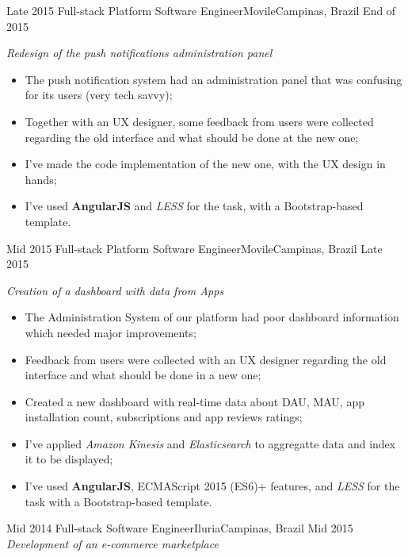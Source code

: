 \begin{experiences}
{\begin{itemize}
          \end{itemize}
        }{}
  \experience
  {Late 2015} {Full-stack Platform Software Engineer}{Movile}{Campinas, Brazil}
  {End of 2015}
        {
        \emph{Redesign of the push notifications administration panel}\\
          \begin{itemize}
            \item The push notification system had an administration panel that was confusing for its users (very tech savvy);
            \item Together with an UX designer, some feedback from users were collected regarding the old interface and what should
            be done at the new one;
            \item I've made the code implementation of the new one, with the UX design in hands;
            \item I've used \textbf{AngularJS} and \emph{LESS} for the task, with a Bootstrap-based template.\\
          \end{itemize}
        }{}
  \experience
  {Mid 2015} {Full-stack Platform Software Engineer}{Movile}{Campinas, Brazil}
  {Late 2015}
        {
        \emph{Creation of a dashboard with data from Apps}\\
          \begin{itemize}
            \item The Administration System of our platform had poor dashboard information which needed major improvements;
            \item Feedback from users were collected with an UX designer regarding the old interface and what should be done in a new one;
            \item Created a new dashboard with real-time data about DAU, MAU, app installation count, subscriptions and app reviews ratings;
            \item I've applied \emph{Amazon Kinesis} and \emph{Elasticsearch} to aggregatte data and index it to be displayed;
            \item I've used \textbf{AngularJS}, ECMAScript 2015 (ES6)+ features, and \emph{LESS} for the task with a Bootstrap-based template.\\
          \end{itemize}
        }{}
  \experience
  {Mid 2014} {Full-stack Software Engineer}{Iluria}{Campinas, Brazil}
  {Mid 2015}
        {
        \emph{Development of an e-commerce marketplace}\\
}
\end{experiences}
